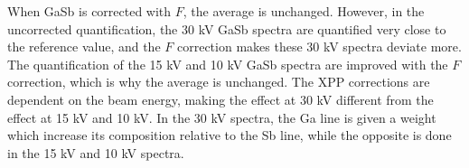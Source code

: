 When GaSb is corrected with $F$, the average is unchanged. 
However, in the uncorrected quantification, the 30 kV GaSb spectra are quantified very close to the reference value, and the $F$ correction makes these 30 kV spectra deviate more.
The quantification of the 15 kV and 10 kV GaSb spectra are improved with the $F$ correction, which is why the average is unchanged.
The XPP corrections are dependent on the beam energy, making the effect at 30 kV different from the effect at 15 kV and 10 kV.
In the 30 kV spectra, the Ga line is given a weight which increase its composition relative to the Sb line, while the opposite is done in the 15 kV and 10 kV spectra.





























% 
% 
